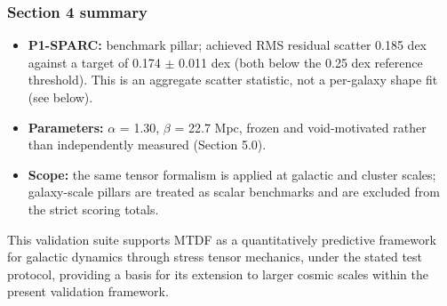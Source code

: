 \documentclass[11pt,a4paper]{article}
\begin{document}
\begin{mdframed}[linecolor=accent,linewidth=0.5pt,backgroundcolor=callout-bg,leftline=true,rightline=true,topline=true,bottomline=true,innerleftmargin=8pt,innerrightmargin=8pt,innertopmargin=6pt,innerbottommargin=6pt]
\subsubsection{Section 4 summary}
\begin{itemize}
  \item \textbf{P1-SPARC:} benchmark pillar; achieved RMS residual scatter 0.185 dex against a target of 0.174 $\pm$ 0.011 dex (both below the 0.25 dex reference threshold). This is an aggregate scatter statistic, not a per-galaxy shape fit (see below).
  \item \textbf{Parameters:} $\alpha$ = 1.30, $\beta$ = 22.7 Mpc, frozen and void-motivated rather than independently measured (Section 5.0).
  \item \textbf{Scope:} the same tensor formalism is applied at galactic and cluster scales; galaxy-scale pillars are treated as scalar benchmarks and are excluded from the strict scoring totals.
\end{itemize}
\end{mdframed}

This validation suite supports MTDF as a quantitatively predictive framework for galactic dynamics through stress tensor mechanics, under the stated test protocol, providing a basis for its extension to larger cosmic scales within the present validation framework.
\end{document}
